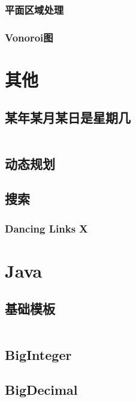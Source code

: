 \documentclass[a4paper]{article}
\newcommand{\cppcode}[1]{
    \inputminted[mathescape]{cpp}{source/#1}
}
\newcommand{\javacode}[1]{
    \inputminted[mathescape]{java}{source/#1}
}
\begin{document}
\subsubsection{平面区域处理}

\subsubsection{Vonoroi图}

\section{其他}

\subsection{某年某月某日是星期几}

\cppcode{miscellany/what-day-is-today.cpp}

\subsection{动态规划}

\subsection{搜索}

\subsubsection{Dancing Links X}

\section{Java}

\subsection{基础模板}

\javacode{template.java}

\subsection{BigInteger}

\subsection{BigDecimal}
\end{document}
